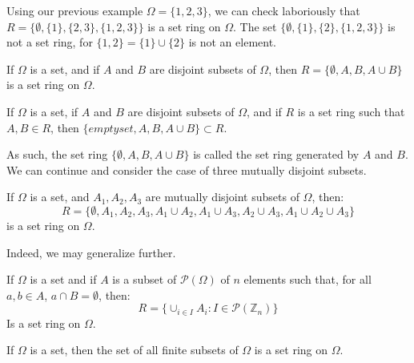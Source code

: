 \documentclass[crop=false,class=book,oneside]{standalone}
\begin{document}
            Using our previous example $\Omega=\{1,2,3\}$,
            we can check laboriously that
            $R=\{\emptyset,\{1\},\{2,3\},\{1,2,3\}\}$ is a
            set ring on $\Omega$. The set
            $\{\emptyset,\{1\},\{2\},\{1,2,3\}\}$ is not
            a set ring, for $\{1,2\}=\{1\}\cup\{2\}$ is not
            an element.
            \begin{theorem}
                If $\Omega$ is a set, and if $A$ and $B$ are
                disjoint subsets of $\Omega$, then
                $R=\{\emptyset,A,B,A\cup{B}\}$ is a set ring
                on $\Omega$.
            \end{theorem}
            \begin{theorem}
                If $\Omega$ is a set, if $A$ and $B$ are
                disjoint subsets of $\Omega$, and if
                $R$ is a set ring such that $A,B\in{R}$,
                then $\{emptyset,A,B,A\cup{B}\}\subset{R}$.
            \end{theorem}
            As such, the set ring $\{\emptyset,A,B,A\cup{B}\}$
            is called the set ring generated by $A$ and $B$. We
            can continue and consider the case of three mutually
            disjoint subsets.
            \begin{theorem}
                If $\Omega$ is a set, and $A_{1},A_{2},A_{3}$ are
                mutually disjoint subsets of $\Omega$, then:
                \begin{equation}
                    R=\{\emptyset,A_{1},A_{2},A_{3},
                        A_{1}\cup{A}_{2},A_{1}\cup{A}_{3},
                        A_{2}\cup{A}_{3},
                        A_{1}\cup{A}_{2}\cup{A}_{3}\}
                \end{equation}
                is a set ring on $\Omega$.
            \end{theorem}
            Indeed, we may generalize further.
            \begin{theorem}
                If $\Omega$ is a set and if
                $A$ is a subset of $\mathcal{P}(\Omega)$ of
                $n$ elements such that, for all
                $a,b\in{A}$, $a\cap{B}=\emptyset$, then:
                \begin{equation}
                    R=\{\cup_{i\in{I}}A_{i}:
                    I\in\mathcal{P}(\mathbb{Z}_{n})\}
                \end{equation}
                Is a set ring on $\Omega$.
            \end{theorem}
            \begin{theorem}
                If $\Omega$ is a set, then the set of all
                finite subsets of $\Omega$ is a set ring on
                $\Omega$.
            \end{theorem}
\end{document}
